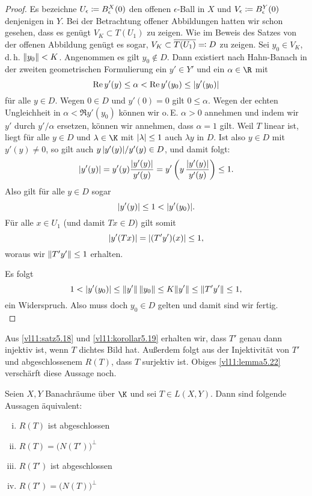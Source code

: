 \begin{proof}
    Es bezeichne $U_\epsilon \coloneqq B^X_\epsilon(0)$ den offenen $\epsilon$-Ball
    in $X$ und $V_\epsilon \coloneqq B^Y_\epsilon(0)$ denjenigen in $Y$.
    Bei der Betrachtung offener Abbildungen hatten wir schon gesehen, dass es
    genügt $V_K \subset T(U_1)$ zu zeigen. Wie im Beweis des Satzes von der
    offenen Abbildung  genügt es sogar,
    $V_K \subset \overline{T(U_1)} \eqqcolon D$ zu zeigen. Sei $y_0\in V_K$,
    d.\,h. $\lVert y_0\rVert < K$. Angenommen es gilt $y_0\notin D$. Dann existiert
    nach Hahn-Banach in der zweiten geometrischen Formulierung
     ein $y'\in Y'$ und ein $\alpha\in\R$ mit
    \[ \operatorname{Re} y'(y) \leq \alpha < \operatorname{Re} y'(y_0) \leq \lvert y'(y_0)\rvert \]
    für alle $y\in D$. 
    Wegen $0\in D$ und $y'(0)=0$ gilt $0\leq\alpha$. Wegen der echten
    Ungleichheit in $\alpha < \Re y'(y_0)$ können wir o.\,E. $\alpha > 0$ 
    annehmen und indem wir $y'$ durch $y'/\alpha$ ersetzen, können wir
    annehmen, dass $\alpha=1$ gilt. Weil $T$ linear ist, liegt für alle
    $y\in D$ und $\lambda\in\K$ mit $\lvert\lambda\rvert\leq1$ auch $\lambda y$
    in $D$. Ist also $y\in D$ mit $y'(y)\neq0$, so gilt auch 
    $y\, \lvert y'(y)\rvert/y'(y) \in D$, und damit folgt: 
    \[ \lvert y'(y)\rvert = y'(y) \frac{\lvert y'(y)\rvert}{y'(y)}
        = y'\left( y \, \frac{\lvert y'(y)\rvert}{y'(y)} \right)
        \leq 1
    . \]
    Also gilt für alle $y\in D$ sogar
    \[ \lvert y'(y)\rvert \leq 1 < \lvert y'(y_0)\rvert  . \]
    Für alle $x\in U_1$ (und damit $Tx\in D$) gilt somit
    \[ \lvert y'(Tx)\rvert = \lvert(T'y')(x)\rvert \leq 1   , \]
    woraus wir $\lVert T'y'\rVert \leq 1$ erhalten.
    
\pagebreak[2]
    Es folgt
    \[ 1 < \lvert y'(y_0)\rvert \leq \lVert y'\rVert\,\lVert y_0\rVert \leq K\lVert y'\rVert 
        \leq \lVert T'y'\rVert \leq 1
    , \]
    ein Widerspruch. Also muss doch $y_0\in D$ gelten und damit sind wir fertig.
    \\
\end{proof}

\nnBemerkung
Aus \cref{vl11:satz5.18} und \cref{vl11:korollar5.19} erhalten wir, dass $T'$
genau dann injektiv ist, wenn $T$ dichtes Bild hat. Außerdem folgt aus der
Injektivität von $T'$ und abgeschlossenem $R(T)$, dass $T$ surjektiv ist.
Obiges \cref{vl11:lemma5.22} verschärft diese Aussage noch.

\begin{thSatz} \label{vl11:satzvomabgbild}
    Seien $X,Y$ Banachräume über $\K$ und sei $T\in L(X,Y)$. Dann sind folgende
    Aussagen äquivalent:
    \begin{enumerate}[(i)]
        \item \label{vl11:satzvomabgbild:i}
            $R(T)$ ist abgeschlossen
        \item \label{vl11:satzvomabgbild:ii}
            $R(T) = \bigl( N(T') \bigr)^\perp$
        \item \label{vl11:satzvomabgbild:iii}
            $R(T')$ ist abgeschlossen
        \item \label{vl11:satzvomabgbild:iv}
            $R(T') = \bigl( N(T) \bigr)^\perp$
    \end{enumerate}
\end{thSatz}


